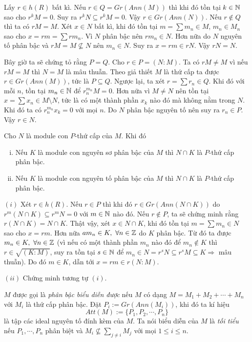 Lấy $r \in h(R)$ bất kì. Nếu $r \in Q = Gr(Ann(M))$ thì khi đó tồn tại $k \in \mathbb N$ sao cho $r^kM = 0$. Suy ra $r^kN \subseteq r^kM = 0$. Vậy $r \in Gr(Ann(N))$. Nếu $r \notin Q$ thì ta có $rM = M$. Xét $x \in N$ bất kì, khi đó tồn tại $m = \sum m_n \in M$, $m_n \in M_n$ sao cho $x = rm = \sum rm_n$. Vì $N$ phân bậc nên $rm_n \in N$. Hơn nữa do $N$ nguyên tố phân bậc và $rM = M \not\subseteq N$ nên $m_n \in N$. Suy ra $x = rm \in rN$. Vậy $rN = N$.

Bây giờ ta sẽ chứng tỏ rằng $P = Q$. Cho $r \in P = (N:M)$. Ta có $rM \neq M$ vì nếu $rM = M$ thì $N = M$ là mâu thuẫn. Theo giả thiết $M$ là thứ cấp ta được $r \in Gr(Ann(M))$, tức là $P \subseteq Q$. Ngược lại, ta xét $r = \sum r_n \in Q$. Khi đó với mỗi $n$, tồn tại $m_n \in \mathbb N$ để $r_n^{m_n}M = 0$. Hơn nữa vì $M \neq N$ nên tồn tại $x = \sum x_n \in M \setminus N$, tức là có một thành phần $x_k$ nào đó mà không nằm trong $N$. Khi đó ta có $r_n^{m_n} x_k = 0$ với mọi $n$. Do $N$ phân bậc nguyên tố nên suy ra $r_n \in P$. Vậy $r \in N$.\QED

\begin{lemma}
    \label{lem:secondaryCondition}
    Cho $N$ là module con $P$-thứ cấp của $M$. Khi đó
    \begin{enumerate}[(i)]
        \item Nếu $K$ là module con nguyên sơ phân bậc của $M$ thì $N \cap K$ là $P$-thứ cấp phân bậc.
        \item Nếu $K$ là module con nguyên tố phân bậc của $M$ thì $N \cap K$ là $P$-thứ cấp phân bậc.
    \end{enumerate}
\end{lemma}
\startproof $(i)$ Xét $r \in h(R)$. Nếu $r \in P$ thì khi đó $r \in Gr(Ann(N \cap K))$ do $r^m(N \cap K) \subseteq r^mN = 0$ với $m \in \mathbb N$ nào đó. Nếu $r \notin P$, ta sẽ chứng minh rằng $r(N \cap K) = N \cap K$. Thật vậy, xét $x \in N \cap K$, khi đó tồn tại $m = \sum m_n \in N$ sao cho $x = rm$. Hơn nữa $am_n \in K,\ \forall n \in \mathbb Z$ do $K$ phân bậc. Từ đó ta được $m_n \in K,\ \forall n \in \mathbb Z$ (vì nếu có một thành phần $m_n$ nào đó để $m_n \notin K$ thì $r \in \sqrt{(K:M)}$, suy ra tồn tại $s \in \mathbb N$ để $m_n \in N = r^sN \subseteq r^sM \subseteq K \Rightarrow$ mâu thuẫn). Do đó $m \in K$, dẫn tới $x = rm \in r(N:M)$.

\noindent
$(ii)$ Chứng minh tương tự $(i)$.

\begin{define}
    $M$ được gọi là \textit{phân bậc biểu diễn được} nếu $M$ có dạng $M = M_1 + M_2 + \cdots + M_n$ với $M_i$ là thứ cấp phân bậc. Đặt $P_i := Gr(Ann(M_i))$, khi đó ta kí hiệu
    $$
        Att(M) := \{P_1, P_2, \cdots,P_n\}
    $$
    là tập các ideal nguyên tố đính kèm của $M$. Ta nói biểu diễn của $M$ là \textit{tối tiểu} nếu $P_1,\cdots,P_n$ phân biệt và $M_i \not\subseteq \sum_{j\neq i} M_j$ với mọi $1 \leq i \leq n$.
\end{define}

